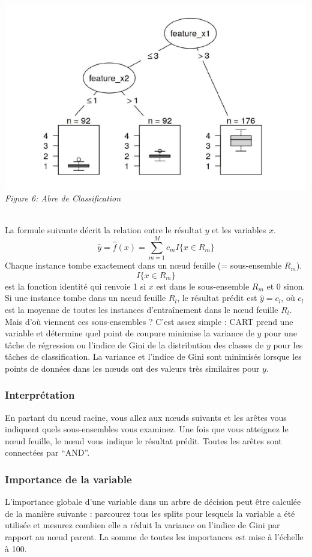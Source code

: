 \begin{center}
    \centering
    \includegraphics[width=0.5\linewidth]{Images/cart.png}
    \\
    \emph{Figure 6: Abre de Classification}
    \\
\end{center}
\\
La formule suivante décrit la relation entre le résultat \(y\) et les variables \(x\).
\[ \hat{y} = \hat{f}(x) = \sum_{m=1}^M c_m I\{x \in R_m\} \]
Chaque instance tombe exactement dans un nœud feuille (= sous-ensemble \(R_m\)).
\[ I\{x \in R_m\} \] est la fonction identité qui renvoie 1 si \(x\) est dans le sous-ensemble \(R_m\) et 0 sinon.
\\
Si une instance tombe dans un nœud feuille \(R_l\), le résultat prédit est \(\hat{y} = c_l\), où \(c_l\) est la moyenne de toutes les instances d'entraînement dans le nœud feuille \(R_l\).
Mais d'où viennent ces sous-ensembles ? C'est assez simple : CART prend une variable et détermine quel point de coupure minimise la variance de \(y\) pour une tâche de régression ou l'indice de Gini de la distribution des classes de \(y\) pour les tâches de classification. La variance et l'indice de Gini sont minimisés lorsque les points de données dans les nœuds ont des valeurs très similaires pour \(y\).

\subsubsection{Interprétation}
En partant du nœud racine, vous allez aux nœuds suivants et les arêtes vous indiquent quels sous-ensembles vous examinez. Une fois que vous atteignez le nœud feuille, le nœud vous indique le résultat prédit. Toutes les arêtes sont connectées par ``AND''.

\subsubsection{Importance de la variable}
L'importance globale d'une variable dans un arbre de décision peut être calculée de la manière suivante : parcourez tous les splits pour lesquels la variable a été utilisée et mesurez combien elle a réduit la variance ou l'indice de Gini par rapport au nœud parent. La somme de toutes les importances est mise à l'échelle à 100.

